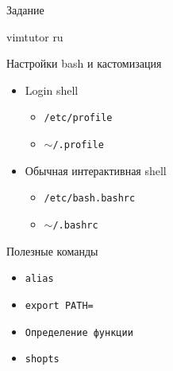 \documentclass[ignorenonframetext, professionalfonts, hyperref={pdftex, unicode}]{beamer}
\begin{document}
\begin{frame}{Задание}
\begin{block}{}
vimtutor ru
\end{block}
\end{frame}

\begin{frame}{Настройки bash и кастомизация}
  \begin{itemize}
    \item Login shell
      \begin{itemize}
        \item {\tt /etc/profile}
        \item {\tt $\sim$/.profile }
      \end{itemize}
    \item Обычная интерактивная shell
      \begin{itemize}
        \item {\tt /etc/bash.bashrc}
        \item {\tt $\sim$/.bashrc}
      \end{itemize}
  \end{itemize}

  Полезные команды
  \begin{itemize}
    \item {\tt alias}
    \item {\tt export PATH=}
    \item {\tt Определение функции}
    \item {\tt shopts}
  \end{itemize}

\end{frame}
\end{document}
